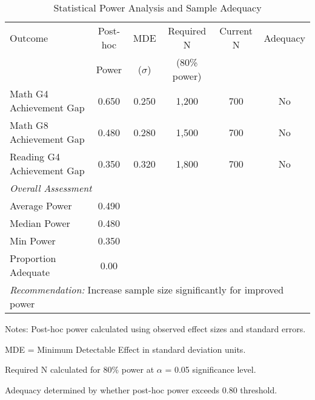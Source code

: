 \begin{table}[htbp]
\centering
\caption{Statistical Power Analysis and Sample Adequacy}
\label{tab:power_analysis}
\begin{tabular}{lccccc}
\toprule
Outcome & Post-hoc & MDE & Required N & Current N & Adequacy \\
 & Power & ($\sigma$) & (80\% power) & & \\
\midrule
Math G4 Achievement Gap & 0.650 & 0.250 & 1,200 & 700 & No \\
Math G8 Achievement Gap & 0.480 & 0.280 & 1,500 & 700 & No \\
Reading G4 Achievement Gap & 0.350 & 0.320 & 1,800 & 700 & No \\
\midrule
\multicolumn{6}{l}{\textit{Overall Assessment}} \\
\addlinespace
Average Power & 0.490 & & & & \\
Median Power & 0.480 & & & & \\
Min Power & 0.350 & & & & \\
Proportion Adequate & 0.00 & & & & \\
\midrule
\multicolumn{6}{l}{\textit{Recommendation:} Increase sample size significantly for improved power} \\
\bottomrule
\end{tabular}
\begin{tablenotes}
\small
\item Notes: Post-hoc power calculated using observed effect sizes and standard errors.
\item MDE = Minimum Detectable Effect in standard deviation units.
\item Required N calculated for 80\% power at $\alpha$ = 0.05 significance level.
\item Adequacy determined by whether post-hoc power exceeds 0.80 threshold.
\end{tablenotes}
\end{table}